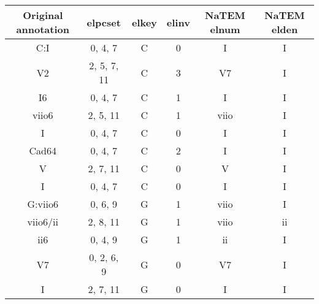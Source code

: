 \begin{tabular}{c|ccc|cc}
Original annotation & elpcset       & elkey & elinv & NaTEM elnum & NaTEM elden \\ \hline
C:I                 & {0, 4, 7}     & C     & 0     & I           & I           \\
V2                  & {2, 5, 7, 11} & C     & 3     & V7          & I           \\
I6                  & {0, 4, 7}     & C     & 1     & I           & I           \\
viio6               & {2, 5, 11}    & C     & 1     & viio        & I           \\
I                   & {0, 4, 7}     & C     & 0     & I           & I           \\
Cad64               & {0, 4, 7}     & C     & 2     & I           & I           \\
V                   & {2, 7, 11}    & C     & 0     & V           & I           \\
I                   & {0, 4, 7}     & C     & 0     & I           & I           \\
G:viio6             & {0, 6, 9}     & G     & 1     & viio        & I           \\
viio6/ii            & {2, 8, 11}    & G     & 1     & viio        & ii          \\
ii6                 & {0, 4, 9}     & G     & 1     & ii          & I           \\
V7                  & {0, 2, 6, 9}  & G     & 0     & V7          & I           \\
I                   & {2, 7, 11}    & G     & 0     & I           & I          
\end{tabular}
